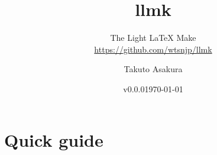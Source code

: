 \documentclass[a4paper,oneside]{scrartcl}
\title{llmk}
\subtitle{The Light {\LaTeX} Make \\
  \href{https://github.com/wtsnjp/llmk}{https://github.com/wtsnjp/llmk}}
\author{Takuto Asakura}
\date{v0.0.0\quad\today}
\begin{document}
\VerbatimFootnotes

\maketitle

\section{Quick guide}
\end{document}

